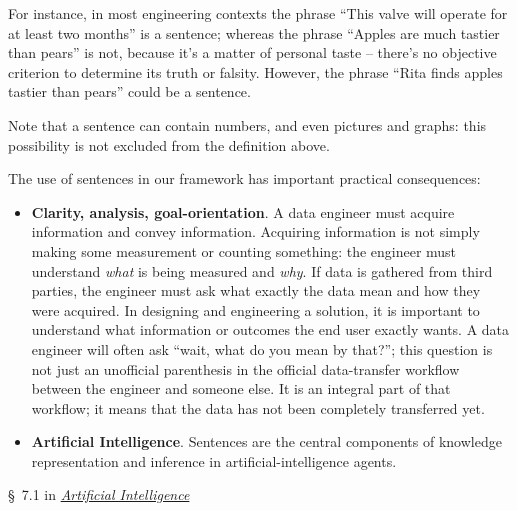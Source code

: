 \documentclass[
  a4paper,
  DIV=11,
  numbers=noendperiod,
  oneside]{scrreprt}
\begin{document}
For instance, in most engineering contexts the phrase ``This valve will
operate for at least two months'' is a sentence; whereas the phrase
``Apples are much tastier than pears'' is not, because it's a matter of
personal taste -- there's no objective criterion to determine its truth
or falsity. However, the phrase ``Rita finds apples tastier than pears''
could be a sentence.

Note that a sentence can contain numbers, and even pictures and graphs:
this possibility is not excluded from the definition above.

The use of sentences in our framework has important practical
consequences:

\begin{itemize}
\item
  \textbf{Clarity, analysis, goal-orientation}. A data engineer must
  acquire information and convey information. Acquiring information is
  not simply making some measurement or counting something: the engineer
  must understand \emph{what} is being measured and \emph{why}. If data
  is gathered from third parties, the engineer must ask what exactly the
  data mean and how they were acquired. In designing and engineering a
  solution, it is important to understand what information or outcomes
  the end user exactly wants. A data engineer will often ask ``wait,
  what do you mean by that?''; this question is not just an unofficial
  parenthesis in the official data-transfer workflow between the
  engineer and someone else. It is an integral part of that workflow; it
  means that the data has not been completely transferred yet.
\item
  \textbf{Artificial Intelligence}. Sentences are the central components
  of knowledge representation and inference in artificial-intelligence
  agents.
\end{itemize}

\begin{tcolorbox}[enhanced jigsaw, rightrule=.15mm, colbacktitle=quarto-callout-caution-color!10!white, coltitle=black, titlerule=0mm, title={\faIcon{book-open} Reading}, colback=white, bottomrule=.15mm, toptitle=1mm, opacitybacktitle=0.6, toprule=.15mm, arc=.35mm, bottomtitle=1mm, colframe=quarto-callout-caution-color-frame, breakable, left=2mm, opacityback=0, leftrule=.75mm]

§~7.1 in
\href{https://hvl.instructure.com/courses/25074/modules/items/660089}{\emph{Artificial
Intelligence}}

\end{tcolorbox}
\end{document}

